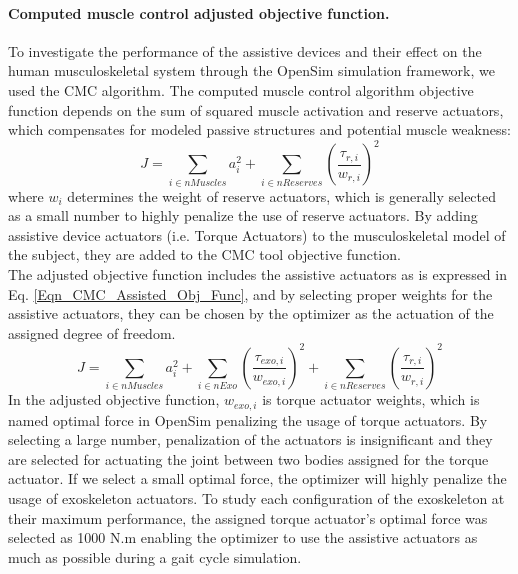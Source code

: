\documentclass[10pt,letterpaper]{article}
\begin{document}
\paragraph*{Computed muscle control adjusted objective function.} To investigate the performance of the assistive devices and their effect on the human musculoskeletal system through the OpenSim simulation framework, we used the CMC algorithm. The computed muscle control algorithm objective function depends on the sum of squared muscle activation and reserve actuators, which compensates for modeled passive structures and potential muscle weakness\cite{93}:
\begin{equation}\label{Eqn_CMC_Normal_Obj_Func}
J = \sum_{i\in nMuscles} a_{i}^{2} + \sum_{i \in nReserves} (\frac{\tau_{r,i}}{w_{r,i}})^2
\end{equation}
where $w_i$ determines the weight of reserve actuators, which is generally selected as a small number to highly penalize the use of reserve actuators. By adding assistive device actuators (i.e. Torque Actuators) to the musculoskeletal model of the subject, they are added to the CMC tool objective function.\\
The adjusted objective function includes the assistive actuators as is expressed in Eq. \eqref{Eqn_CMC_Assisted_Obj_Func}, and by selecting proper weights for the assistive actuators, they can be chosen by the optimizer as the actuation of the assigned degree of freedom.
\begin{equation}\label{Eqn_CMC_Assisted_Obj_Func}
	J = \sum_{i\in nMuscles} a_{i}^{2} + \sum_{i \in nExo} \left(\frac{\tau_{exo,i}}{w_{exo,i}}\right)^{2} +  \sum_{i \in nReserves} \left(\frac{\tau_{r,i}}{w_{r,i}}\right)^2
\end{equation}
In the adjusted objective function, $w_{exo,i}$ is torque actuator weights, which is named optimal force in OpenSim \cite{93} penalizing the usage of torque actuators. By selecting a large number, penalization of the actuators is insignificant and they are selected for actuating the joint between two bodies assigned for the torque actuator. If we select a small optimal force, the optimizer will highly penalize the usage of exoskeleton actuators. To study each configuration of the exoskeleton at their maximum performance, the assigned torque actuator's optimal force was selected as 1000 N.m enabling the optimizer to use the assistive actuators as much as possible during a gait cycle simulation.\\
\end{document}
